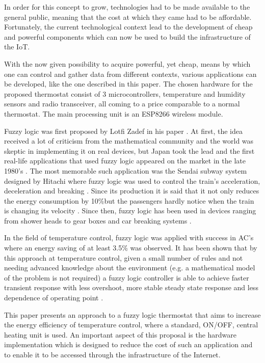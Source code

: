 \documentclass[conference]{IEEEtran}
\begin{document}
In order for this concept to grow, technologies had to be made available to the general public, meaning that
the cost at which they came had to be affordable. Fortunately, the current technological context lead to
the development of cheap and powerful components which can now be used to build the infrastructure of the IoT.

With the now given possibility to acquire powerful, yet cheap, means by which one can control and gather data
from different contexts, various applications can be developed, like the one described in this paper.
The chosen hardware for the proposed thermostat consist of 3 microcontrollers, temperature and humidity sensors
and radio transceiver, all coming to a price comparable to a normal thermostat. The main processing unit
is an ESP8266 wireless module.

Fuzzy logic was first proposed by Lotfi Zadef in his paper  \cite{FuzzySets}. At first, the
idea received a lot of criticism from the mathematical community and the world was skeptic in implementing it
on real devices, but Japan took the lead and the first real-life applications that used fuzzy logic appeared on
the market in the late 1980's \cite{zadeh1996fuzzy}. The most memorable such application was the Sendai subway
system designed by Hitachi where fuzzy logic was used to control the train's acceleration, deceleration and
breaking \cite{zadeh1996fuzzy}. Since its production it is said that it not only reduces the energy
consumption by 10\%but the passengers hardly notice when the train is changing its velocity
\cite{FuzzyLogicMassUse}. Since then, fuzzy logic has been used in devices ranging from shower heads
\cite{zadeh1996fuzzy} to gear boxes and car breaking systems \cite{FuzzyAutomotive}.

In the field of temperature control, fuzzy logic was applied with success in AC's \cite{FuzzyAppliences} where
an energy saving of at least 3.5\% was observed. It has been shown that by this approach at temperature
control, given a small number of rules and not needing advanced knowledge about the environment (e.g. a
mathematical model of the problem is not required) a fuzzy logic controller is able to achieve faster transient
response with less overshoot, more stable steady state response and less dependence of operating point
\cite{FuzzyTempControl}.

This paper presents an approach to a fuzzy logic thermostat that aims to increase the energy efficiency
of temperature control, where a standard, ON/OFF, central heating unit is used. An important aspect of this
proposal is the hardware implementation which is designed to reduce the cost of such an application and to
enable it to be accessed through the infrastructure of the Internet.
\end{document}
